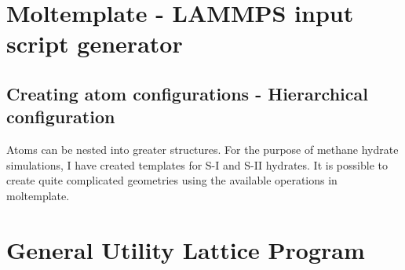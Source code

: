 \section{Moltemplate - LAMMPS input script generator}
\subsection{Creating atom configurations - Hierarchical configuration}
Atoms can be nested into greater structures. For the purpose of methane hydrate simulations, I have created templates for S-I and S-II hydrates. It is possible to create quite complicated geometries using the available operations in moltemplate. 

\section{General Utility Lattice Program}

